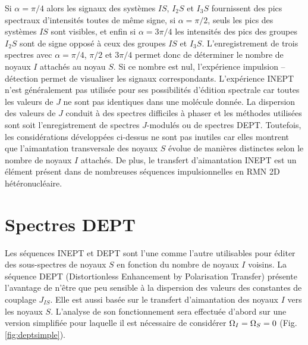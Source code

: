 Si $\alpha = \pi/4$ alors les signaux des systèmes $IS$, $I_2S$ et $I_3S$
fournissent des pics spectraux d'intensités toutes de même signe, si
$\alpha = \pi/2$, seuls les pics des systèmes $IS$ sont visibles, et enfin
si $\alpha = 3\pi/4$ les intensités des pics des groupes $I_2S$ sont de signe opposé
à ceux des groupes $IS$ et $I_3S$.
L'enregistrement de trois spectres avec $\alpha = \pi/4$, $\pi/2$ et $3\pi/4$
permet donc de déterminer le nombre de noyaux $I$ attachés au noyau $S$.
Si ce nombre est nul, l'expérience impulsion -- détection permet de visualiser
les signaux correspondants.
L'expérience INEPT n'est généralement pas utilisée pour ses possibilités
d'édition spectrale car toutes les valeurs de $J$ ne sont pas identiques
dans une molécule donnée.
La dispersion des valeurs de $J$ conduit à des spectres difficiles à phaser
et les méthodes utilisées sont soit l'enregistrement de spectres $J$-modulés
ou de spectres DEPT.
Toutefois, les considérations développées ci-dessus 
ne sont pas inutiles car elles montrent que l'aimantation
transversale des noyaux $S$ évolue de manières distinctes selon le
nombre de noyaux $I$ attachés.
De plus, le transfert d'aimantation INEPT est un élément présent dans de nombreuses
séquences impulsionnelles en RMN 2D hétéronucléaire.

\section{Spectres DEPT}
Les séquences INEPT et DEPT sont l'une comme l'autre utilisables
pour éditer des sous-spectres de noyaux $S$ en fonction du nombre de noyaux $I$ voisins. 
La séquence DEPT (Distortionless Enhancement by Polarisation Transfer)
présente l'avantage de n'être que peu sensible à la dispersion
des valeurs des constantes de couplage $J_{IS}$.
Elle est aussi basée sur le transfert d'aimantation des noyaux $I$ vers les noyaux $S$.
L'analyse de son fonctionnement sera effectuée d'abord sur une version simplifiée
pour laquelle il est nécessaire de considérer $\Omega_I = \Omega_S = 0$
(Fig. \ref{fig:deptsimple}).


